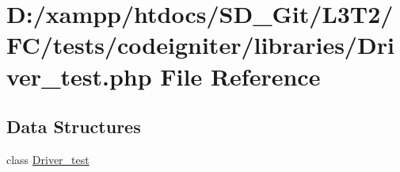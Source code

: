\hypertarget{tests_2codeigniter_2libraries_2_driver__test_8php}{}\section{D\+:/xampp/htdocs/\+S\+D\+\_\+\+Git/\+L3\+T2/\+F\+C/tests/codeigniter/libraries/\+Driver\+\_\+test.php File Reference}
\label{tests_2codeigniter_2libraries_2_driver__test_8php}
\subsection*{Data Structures}
\begin{DoxyCompactItemize}
\item 
class \hyperlink{class_driver__test}{Driver\+\_\+test}
\end{DoxyCompactItemize}
